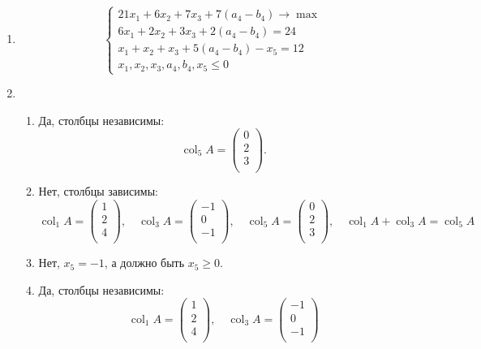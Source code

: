 \documentclass[12pt]{article}
\DeclareMathOperator{\col}{col}
\begin{document}
\begin{enumerate}
\item 
\[
\begin{cases}
  21x_1 + 6x_2 + 7x_3 + 7(a_4 - b_4) \to \max \\
  6x_1 + 2x_2 + 3x_3 + 2(a_4 - b_4) = 24 \\
  x_1 + x_2 + x_3 + 5(a_4 - b_4) - x_5 = 12 \\
  x_1, x_2, x_3, a_4, b_4, x_5 \leq 0    
\end{cases}
\]

\item 
\begin{enumerate}
  \item Да, столбцы независимы:
  \[
  \col_5 A = \begin{pmatrix}
    0 \\ 
    2 \\ 
    3 \\
  \end{pmatrix}.
  \]
  \item Нет, столбцы зависимы:
  \[
  \col_1 A = \begin{pmatrix}
    1 \\
    2 \\
    4 \\
  \end{pmatrix}, \quad 
  \col_3 A = \begin{pmatrix}
    -1 \\
    0 \\
    -1 \\
  \end{pmatrix}, \quad 
  \col_5 A = \begin{pmatrix}
    0 \\ 
    2 \\ 
    3 \\
  \end{pmatrix}, \quad 
  \col_1 A + \col_3 A = \col_5 A
  \]
  \item Нет, $x_5  = -1$, а должно быть $x_5 \geq 0$. 
  \item Да, столбцы независимы:
  \[
    \col_1 A = \begin{pmatrix}
      1 \\
      2 \\
      4 \\
    \end{pmatrix}, \quad 
    \col_3 A = \begin{pmatrix}
      -1 \\
      0 \\
      -1 \\
    \end{pmatrix}
  \]

\end{enumerate}



\end{enumerate}
\end{document}
